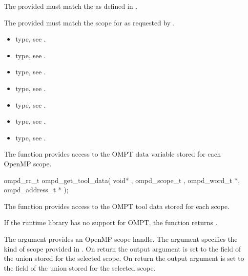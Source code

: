 The provided  must match the  as defined in 
. 

The provided  must match the scope for  as requested by 
. 


\crossreferences
\begin{itemize}
	\item {} type, see 
	.
	\item {} type, see .
	\item {} type, see 
	.
	\item {} type, see .
	\item {} type, see .
	\item {} type, see .
	\item {} type, see .
\end{itemize}

\label{subsubsubsec:ompd_get_tool_data}
\summary
The  function provides access to the OMPT data variable 
stored for each OpenMP scope.

\format

\begin{cspecific}
\begin{ompSyntax}
ompd_rc_t ompd_get_tool_data(
  void* , 
  ompd_scope_t ,
  ompd_word_t *,
  ompd_address_t *
);
\end{ompSyntax}
\end{cspecific}

\descr
The function  provides access to the OMPT tool data
stored for each scope.

If the runtime library has no support for OMPT, the function returns 
.


\argdesc
The argument  provides an OpenMP scope handle.
The argument  specifies the kind of scope provided in .
On return the output argument  is set to the  field of the 
 union stored for the selected scope.
On return the output argument  is set to the   field of the 
 union stored for the selected scope.


